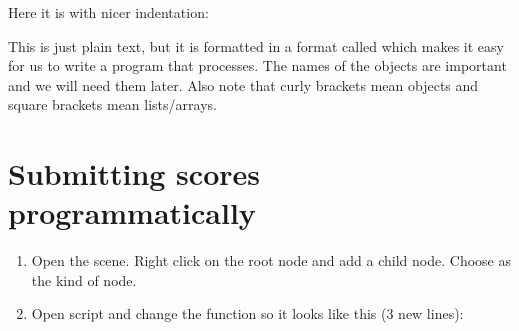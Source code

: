 \documentclass[letterpaper,10pt,english]{sphinxmanual}
\begin{document}
\sphinxAtStartPar
{}

\sphinxAtStartPar
Here it is with nicer indentation:

\begin{sphinxVerbatim}[commandchars=\\\{\}]
      \PYG{p}{[}
      \PYG{p}{]}
\end{sphinxVerbatim}

\sphinxAtStartPar
This is just plain text, but it is formatted in a format called 
which makes it easy for us to write a program that processes. The names
of the objects are important and we will need them later. Also note that
curly brackets mean objects and square brackets mean lists/arrays.


\section{Submitting scores programmatically}
\label{\detokenize{tutorial:submitting-scores-programmatically}}\begin{enumerate}
%
\item {} 
\sphinxAtStartPar
Open the  scene. Right click on the root node and
add a child node. Choose  as the kind of node.

\item {} 
\sphinxAtStartPar
Open  script and change the
 function so it looks like this (3 new
lines):

\end{enumerate}
\end{document}
